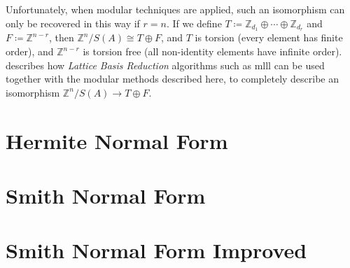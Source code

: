 \documentclass[12pt,a4paper,answers]{exam}
\newcommand{\Z}{\mathbb{Z}}
\theoremstyle{definition}
\begin{document}
Unfortunately, when modular techniques are applied, such an isomorphism can only be recovered in this way if $r=n$. If we define $T\coloneqq\Z_{d_1}\oplus\cdots\oplus\Z_{d_r}$ and $F\coloneqq\Z^{n-r}$, then $\Z^n/S(A)\cong T\oplus F$, and $T$ is torsion (every element has finite order), and $\Z^{n-r}$ is torsion free (all non-identity elements have infinite order). \cite{havas} describes how \emph{Lattice Basis Reduction} algorithms such as {\sc mlll} can be used together with the modular methods described here, to completely describe an isomorphism $\Z^n/S(A)\to T\oplus F$.

\printbibliography
  
\appendix

\section{Hermite Normal Form}

\label{hnfcode}



\section{Smith Normal Form}

\label{snfcode}



\section{Smith Normal Form Improved}

\label{snfimprovedcode}


\end{document}
